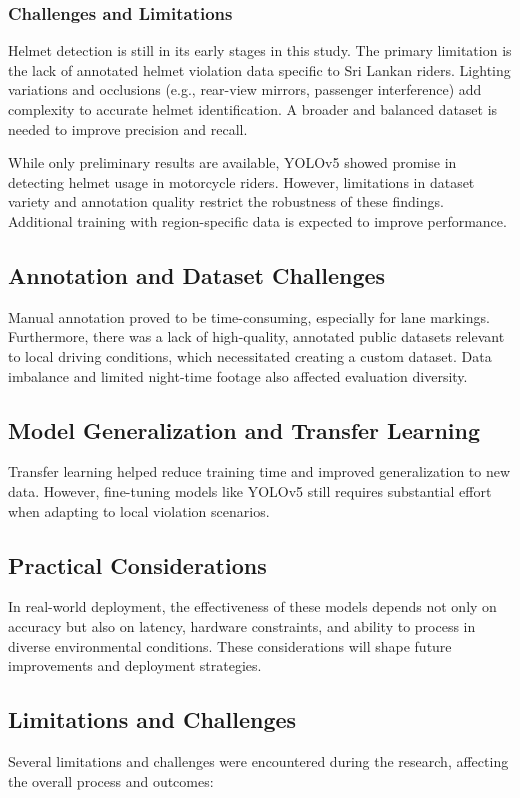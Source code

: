 \documentclass[12pt,a4paper]{article}
\begin{document}
\subsubsection{Challenges and Limitations}
Helmet detection is still in its early stages in this study. The primary limitation is the lack of annotated helmet violation data specific to Sri Lankan riders. Lighting variations and occlusions (e.g., rear-view mirrors, passenger interference) add complexity to accurate helmet identification. A broader and balanced dataset is needed to improve precision and recall.

While only preliminary results are available, YOLOv5 showed promise in detecting helmet usage in motorcycle riders. However, limitations in dataset variety and annotation quality restrict the robustness of these findings. Additional training with region-specific data is expected to improve performance.

\subsection{Annotation and Dataset Challenges}
Manual annotation proved to be time-consuming, especially for lane markings. Furthermore, there was a lack of high-quality, annotated public datasets relevant to local driving conditions, which necessitated creating a custom dataset. Data imbalance and limited night-time footage also affected evaluation diversity.

\subsection{Model Generalization and Transfer Learning}
Transfer learning helped reduce training time and improved generalization to new data. However, fine-tuning models like YOLOv5 still requires substantial effort when adapting to local violation scenarios.

\subsection{Practical Considerations}
In real-world deployment, the effectiveness of these models depends not only on accuracy but also on latency, hardware constraints, and ability to process in diverse environmental conditions. These considerations will shape future improvements and deployment strategies.

\subsection{Limitations and Challenges}
Several limitations and challenges were encountered during the research, affecting the overall process and outcomes:
\end{document}
